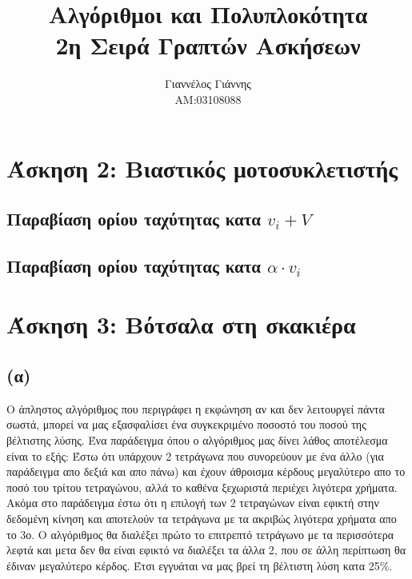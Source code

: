 \documentclass[a4paper,12pt]{report}
\title{ Αλγόριθμοι και Πολυπλοκότητα \\ 2η Σειρά Γραπτών Ασκήσεων}
\author{Γιαννέλος Γιάννης\\ΑΜ:03108088}
\begin{document}
\maketitle

\section*{Άσκηση 2: Βιαστικός μοτοσυκλετιστής}
\subsection*{Παραβίαση ορίου ταχύτητας κατα $v_i+V$}

\subsection*{Παραβίαση ορίου ταχύτητας κατα $\alpha \cdot v_i$}

\section*{Άσκηση 3: Βότσαλα στη σκακιέρα}
\subsection*{(α)}
Ο άπληστος αλγόριθμος που περιγράφει η εκφώνηση αν και δεν λειτουργεί πάντα σωστά, μπορεί να μας εξασφαλίσει ένα συγκεκριμένο ποσοστό του ποσού της βέλτιστης λύσης. Ένα παράδειγμα όπου ο αλγόριθμος μας δίνει λάθος αποτέλεσμα είναι το εξής: Έστω ότι υπάρχουν 2 τετράγωνα που συνορεύουν με ένα άλλο (για παράδειγμα απο δεξιά και απο πάνω) και έχουν άθροισμα κέρδους μεγαλύτερο απο το ποσό του τρίτου τετραγώνου, αλλά το καθένα ξεχωριστά περιέχει λιγότερα χρήματα. Ακόμα στο παράδειγμα έστω ότι η επιλογή των 2 τετραγώνων είναι εφικτή στην δεδομένη κίνηση και αποτελούν τα τετράγωνα με τα ακριβώς λιγότερα χρήματα απο το 3ο. Ο αλγόριθμος θα διαλέξει πρώτο το επιτρεπτό τετράγωνο με τα περισσότερα λεφτά και μετα δεν θα είναι εφικτό να διαλέξει τα άλλα 2, που σε άλλη περίπτωση θα έδιναν μεγαλύτερο κέρδος. Έτσι εγγυάται να μας βρεί τη βέλτιστη λύση κατα 25\%.    
\end{document}
